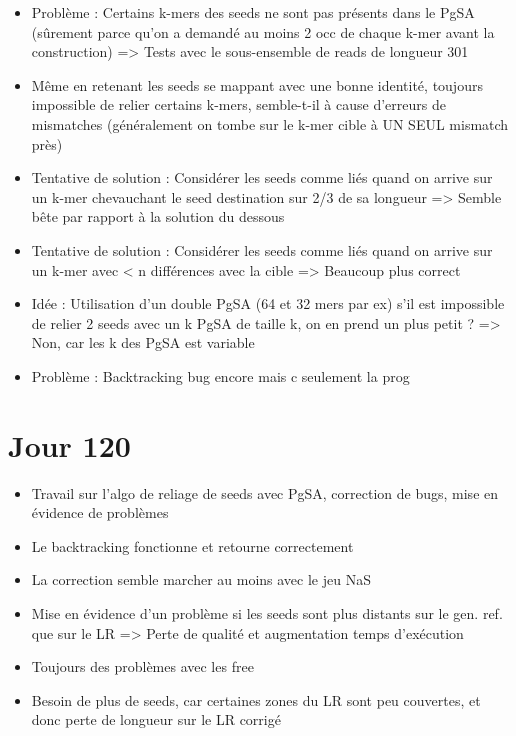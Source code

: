 \documentclass[12pt]{report}
\begin{document}
\begin{itemize}
	\item Problème : Certains k-mers des seeds ne sont pas présents dans le PgSA (sûrement parce qu'on a demandé au moins 2 occ de chaque k-mer avant
		  la construction) => Tests avec le sous-ensemble de reads de longueur 301
		  
	\item Même en retenant les seeds se mappant avec une bonne identité, toujours impossible de relier certains k-mers, semble-t-il
		  à cause d'erreurs de mismatches (généralement on tombe sur le k-mer cible à UN SEUL mismatch près)
		  
	\item Tentative de solution : Considérer les seeds comme liés quand on arrive sur un k-mer chevauchant le seed destination sur 2/3 de sa longueur
		  => Semble bête par rapport à la solution du dessous
		  
	\item Tentative de solution : Considérer les seeds comme liés quand on arrive sur un k-mer avec < n différences avec la cible
		  => Beaucoup plus correct
		  
	\item Idée : Utilisation d'un double PgSA (64 et 32 mers par ex) s'il est impossible de relier 2 seeds avec un k PgSA de taille k,
		  on en prend un plus petit ? => Non, car les k des PgSA est variable
	
	\item Problème : Backtracking bug encore mais c seulement la prog
\end{itemize}

\section{Jour 120}

\begin{itemize}
	\item Travail sur l'algo de reliage de seeds avec PgSA, correction de bugs, mise en évidence de problèmes
	
	\item Le backtracking fonctionne et retourne correctement
	
	\item La correction semble marcher au moins avec le jeu NaS
	
	\item Mise en évidence d'un problème si les seeds sont plus distants sur le gen. ref. que sur le LR
		  => Perte de qualité et augmentation temps d'exécution
	
	\item Toujours des problèmes avec les free
	
	\item Besoin de plus de seeds, car certaines zones du LR sont peu couvertes, et donc perte de longueur sur le LR corrigé
\end{itemize}
\end{document}
